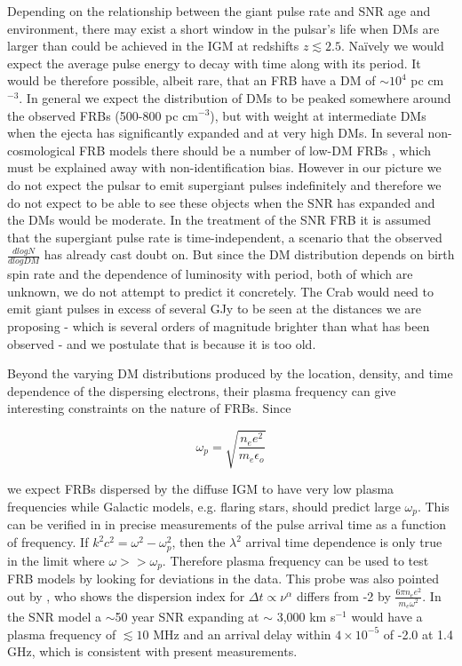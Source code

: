 \documentclass[useAMS,usenatbib]{mn2e}
\begin{document}
Depending on the relationship between the giant pulse rate and SNR
age and environment, there may exist a short window in the pulsar's life when 
DMs are larger than could be achieved in the IGM at redshifts $z\lesssim2.5$. 
Na\"ively we would expect the average pulse 
energy to decay with time along with its period. 
It would be therefore possible, albeit rare, that an FRB have a DM 
 of $\sim10^4$ pc cm$^{-3}$. In general we expect the distribution of DMs 
to be peaked somewhere around the observed FRBs (500-800  pc cm$^{-3}$),
but with weight at intermediate 
DMs when the ejecta has significantly expanded and at very high DMs. In several
non-cosmological FRB models there should be a number of low-DM FRBs
 \citep{2015arXiv150101341P, 2015arXiv150400200X}, which must be explained
 away with non-identification bias. However in our 
picture we do not expect the pulsar to emit supergiant pulses indefinitely and 
therefore we do not expect to be able to see these objects when the SNR has 
expanded and the DMs would be moderate. In the \cite{2015arXiv150506220K} treatment
of the SNR FRB
it is assumed that the supergiant pulse rate is time-independent, a scenario that the 
observed $\frac{dlogN}{dlogDM}$ has already cast doubt on. But since the
DM distribution depends on birth spin rate and the dependence of luminosity 
with period, both of which are unknown, we do not attempt to predict it concretely. 
The Crab would need to emit giant pulses in excess of several GJy to be 
seen at the distances we are proposing - which is several orders of
magnitude brighter than what has been observed - 
and we postulate that is because it is too old.

Beyond the varying DM distributions produced by the location, density, 
and time dependence of the dispersing electrons, their plasma frequency 
can give interesting constraints on the nature of FRBs. Since 

\begin{equation}
\omega_p = \sqrt{\frac{n_e e^2}{m_e \epsilon_o}}
\end{equation}

\noindent we expect FRBs dispersed by 
the diffuse IGM to have very low plasma frequencies while Galactic models,
e.g. flaring stars, should predict large $\omega_p$. This can be verified 
in in precise measurements of the pulse arrival time as a function of frequency.
If $k^2c^2 = \omega^2 - \omega_p^2$, then the $\lambda^2$ arrival time 
dependence is only true in the limit where $\omega >> \omega_p$.
Therefore plasma frequency can be used to test FRB models 
by looking for deviations in the data. This probe 
was also pointed out by \cite{2015arXiv150506220K}, 
who shows the dispersion index for
$\Delta t \propto \nu^{\alpha}$ differs from -2 by 
$\frac{6 \pi n_e e^2}{m_e \omega^2}$.
In the SNR model a $\sim$50 year SNR expanding at
$\sim$ 3,000 km s$^{-1}$
would have a plasma frequency of $\lesssim 10$ MHz and an arrival 
delay within $4 \times 10^{-5}$ of -2.0 at 1.4 GHz, which is consistent with 
present measurements. 
 
\end{document}
